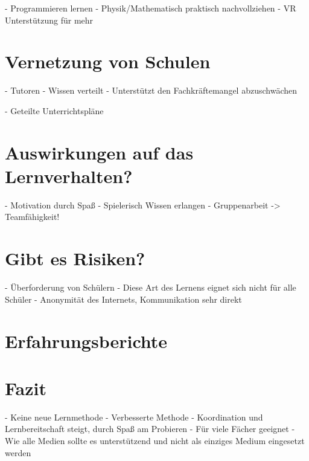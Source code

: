 - Programmieren lernen
- Physik/Mathematisch praktisch nachvollziehen
- VR Unterstützung für mehr 

\section{Vernetzung von Schulen}
- Tutoren
- Wissen verteilt
- Unterstützt den Fachkräftemangel abzuschwächen

- Geteilte Unterrichtspläne
\section{Auswirkungen auf das Lernverhalten?}
- Motivation durch Spaß
- Spielerisch Wissen erlangen
- Gruppenarbeit -> Teamfähigkeit!

\section{Gibt es Risiken?}
- Überforderung von Schülern
- Diese Art des Lernens eignet sich nicht für alle Schüler
- Anonymität des Internets, Kommunikation sehr direkt

\section{Erfahrungsberichte}

\section{Fazit}
- Keine neue Lernmethode
- Verbesserte Methode
- Koordination und Lernbereitschaft steigt, durch Spaß am Probieren
- Für viele Fächer geeignet
- Wie alle Medien sollte es unterstützend und nicht als einziges Medium eingesetzt werden